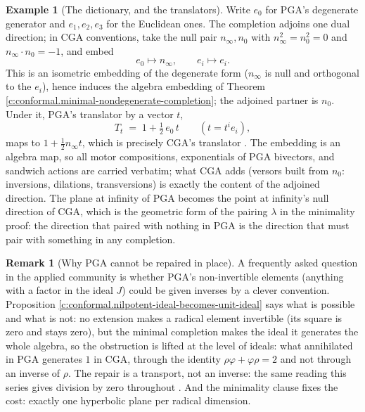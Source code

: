 \documentclass[11pt]{article}
\theoremstyle{definition}
\newtheorem{remark}[theorem]{Remark}
\newtheorem{example}[theorem]{Example}
\theoremstyle{plain}
\providecommand{\nInf}{}\renewcommand{\nInf}{n_\infty}
\providecommand{\nO}{}\renewcommand{\nO}{n_0}
\begin{document}
\begin{example}[The dictionary, and the translators]\label{c:note.conformal.dictionary-translators}
Write $e_0$ for PGA's degenerate generator and $e_1, e_2, e_3$ for the Euclidean ones. The completion adjoins one dual direction; in CGA conventions, take the null pair $\nInf, \nO$ with $\nInf^2 = \nO^2 = 0$ and $\nInf \cdot \nO = -1$, and embed
\[
e_0 \longmapsto \nInf, \qquad e_i \longmapsto e_i .
\]
This is an isometric embedding of the degenerate form ($\nInf$ is null and orthogonal to the $e_i$), hence induces the algebra embedding of Theorem \ref{c:conformal.minimal-nondegenerate-completion}; the adjoined partner is $\nO$. Under it, PGA's translator by a vector $t$,
\[
T_t \;=\; 1 + \tfrac12\, e_0\, t \qquad (t = t^i e_i),
\]
maps to $1 + \tfrac12 \nInf t$, which is precisely CGA's translator \cite{DFM2007}. The embedding is an algebra map, so all motor compositions, exponentials of PGA bivectors, and sandwich actions are carried verbatim; what CGA adds (versors built from $\nO$: inversions, dilations, transversions) is exactly the content of the adjoined direction. The plane at infinity of PGA becomes the point at infinity's null direction of CGA, which is the geometric form of the pairing $\lambda$ in the minimality proof: the direction that paired with nothing in PGA is the direction that must pair with something in any completion.
\end{example}

\begin{remark}[Why PGA cannot be repaired in place]\label{c:note.conformal.why-pga-cannot-be-repaired-place}
A frequently asked question in the applied community is whether PGA's non-invertible elements (anything with a factor in the ideal $J$) could be given inverses by a clever convention. Proposition \ref{c:conformal.nilpotent-ideal-becomes-unit-ideal} says what is possible and what is not: no extension makes a radical element invertible (its square is zero and stays zero), but the minimal completion makes the ideal it generates the whole algebra, so the obstruction is lifted at the level of ideals: what annihilated in PGA generates $1$ in CGA, through the identity $\rho\varphi + \varphi\rho = 2$ and not through an inverse of $\rho$. The repair is a transport, not an inverse: the same reading this series gives division by zero throughout \cite{ButlerT1}. And the minimality clause fixes the cost: exactly one hyperbolic plane per radical dimension.
\end{remark}
\end{document}
